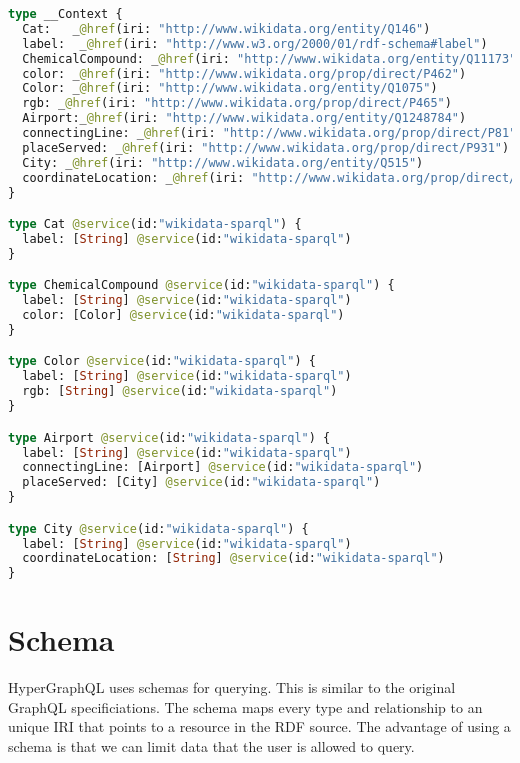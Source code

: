 \begin{minipage}{\linewidth}
\begin{lstlisting}[label=lst:36, caption={Annotated Scehma in HyperGraphQL}, language=GraphQL]
type __Context {
  Cat:   _@href(iri: "http://www.wikidata.org/entity/Q146")
  label:  _@href(iri: "http://www.w3.org/2000/01/rdf-schema#label")
  ChemicalCompound: _@href(iri: "http://www.wikidata.org/entity/Q11173")
  color: _@href(iri: "http://www.wikidata.org/prop/direct/P462")
  Color: _@href(iri: "http://www.wikidata.org/entity/Q1075")
  rgb: _@href(iri: "http://www.wikidata.org/prop/direct/P465")
  Airport:_@href(iri: "http://www.wikidata.org/entity/Q1248784")
  connectingLine: _@href(iri: "http://www.wikidata.org/prop/direct/P81")
  placeServed: _@href(iri: "http://www.wikidata.org/prop/direct/P931")
  City: _@href(iri: "http://www.wikidata.org/entity/Q515")
  coordinateLocation: _@href(iri: "http://www.wikidata.org/prop/direct/P625")
}

type Cat @service(id:"wikidata-sparql") {
  label: [String] @service(id:"wikidata-sparql")
}

type ChemicalCompound @service(id:"wikidata-sparql") {
  label: [String] @service(id:"wikidata-sparql")
  color: [Color] @service(id:"wikidata-sparql")
}

type Color @service(id:"wikidata-sparql") {
  label: [String] @service(id:"wikidata-sparql")
  rgb: [String] @service(id:"wikidata-sparql")
}

type Airport @service(id:"wikidata-sparql") {
  label: [String] @service(id:"wikidata-sparql")
  connectingLine: [Airport] @service(id:"wikidata-sparql")
  placeServed: [City] @service(id:"wikidata-sparql")
}

type City @service(id:"wikidata-sparql") {
  label: [String] @service(id:"wikidata-sparql")
  coordinateLocation: [String] @service(id:"wikidata-sparql")
}
\end{lstlisting}
\end{minipage}


\section{Schema}
HyperGraphQL uses schemas for querying. This is similar to the original GraphQL specificiations. The schema maps every type and relationship to an unique IRI that points to a resource in the RDF source. The advantage of using a schema is that we can limit data that the user is allowed to query. 

